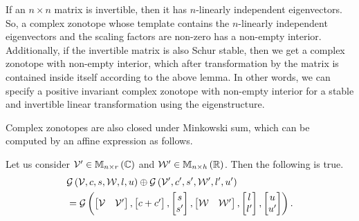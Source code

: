 %
If an $n\times n$ matrix is invertible, then it has $n$-linearly
independent eigenvectors.  So, a complex zonotope whose template
contains the $n$-linearly independent eigenvectors and the scaling
factors are non-zero has a non-empty interior.  Additionally, if the
invertible matrix is also Schur stable, then we get a complex zonotope
with non-empty interior, which after transformation by the matrix is
contained inside itself according to the above lemma.  In other words,
we can specify a positive invariant complex zonotope with non-empty
interior for a stable and invertible linear transformation using the
eigenstructure.

Complex zonotopes are also closed under Minkowski sum, which can be
computed by an affine expression as
follows.
%
\begin{lemma}
Let us consider $\mathcal{V}^\prime\in\mathbb{M}_{n\times r}\left(\mathbb{C}\right)$ and
$\mathcal{W}^\prime\in\mathbb{M}_{n\times h}\left(\mathbb{R}\right)$.  Then the following is true.
%
\begin{align*}
&
  \mathcal{G}\left(\mathcal{V},c,s,\mathcal{W},l,u\right)\oplus\mathcal{G}\left(\mathcal{V}^\prime,c^\prime,
    s^\prime,\mathcal{W}^\prime,l^\prime,u^\prime\right)\\
& = \mathcal{G}\left(
    \left[\begin{matrix}\mathcal{V} & \mathcal{V}^\prime\end{matrix}\right]
  ,
            \left[\begin{matrix}c+c^\prime\end{matrix}\right]
          ,\left[\begin{matrix}s\\s^\prime\end{matrix}\right]
          ,\left[\begin{matrix}\mathcal{W} & \mathcal{W}^\prime\end{matrix}\right]
          ,\left[\begin{matrix}l\\ l^\prime\end{matrix}\right]
          ,\left[\begin{matrix}u\\ u^\prime\end{matrix}\right]
          \right).
\end{align*}
%
\end{lemma}
%
